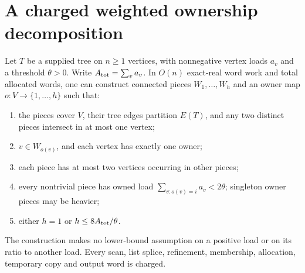\section[Weighted tree ownership]{A charged weighted ownership decomposition}
\label{sec:op3-weighted-tree-ownership}

\begin{theorem}
\label{thm:op3-weighted-tree-ownership}
Let $T$ be a supplied tree on $n\geq1$ vertices, with nonnegative
vertex loads $a_v$ and a threshold $\theta>0$. Write
$A_{\rm tot}=\sum_v a_v$. In $O(n)$ exact-real word work and total
allocated words, one can construct connected pieces $W_1,\ldots,W_h$
and an owner map $o:V\to\{1,\ldots,h\}$ such that:
\begin{enumerate}[label=(\roman*),leftmargin=*]
\item the pieces cover $V$, their tree edges partition $E(T)$, and any
two distinct pieces intersect in at most one vertex;
\item $v\in W_{o(v)}$, and each vertex has exactly one owner;
\item each piece has at most two vertices occurring in other pieces;
\item every nontrivial piece has owned load
$\sum_{v:o(v)=i}a_v<2\theta$; singleton owner pieces may be heavier;
\item either $h=1$ or $h\leq8A_{\rm tot}/\theta$.
\end{enumerate}
The construction makes no lower-bound assumption on a positive load or
on its ratio to another load. Every scan, list splice, refinement,
membership, allocation, temporary copy and output word is charged.
\end{theorem}
